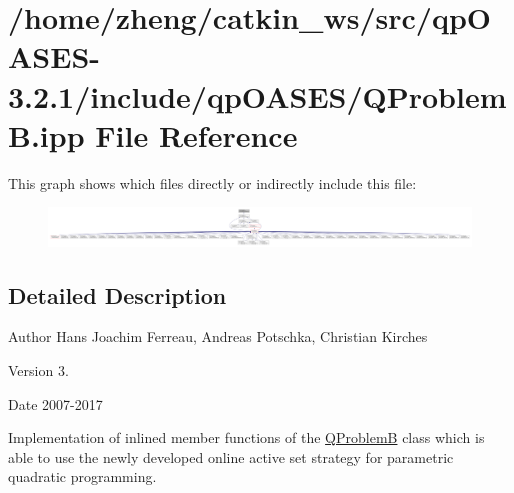\hypertarget{_q_problem_b_8ipp}{}\section{/home/zheng/catkin\+\_\+ws/src/qp\+O\+A\+S\+E\+S-\/3.2.1/include/qp\+O\+A\+S\+E\+S/\+Q\+ProblemB.ipp File Reference}
\label{_q_problem_b_8ipp}
This graph shows which files directly or indirectly include this file\+:
\nopagebreak
\begin{figure}[H]
\begin{center}
\leavevmode
\includegraphics[width=350pt]{_q_problem_b_8ipp__dep__incl}
\end{center}
\end{figure}


\subsection{Detailed Description}
\begin{DoxyAuthor}{Author}
Hans Joachim Ferreau, Andreas Potschka, Christian Kirches 
\end{DoxyAuthor}
\begin{DoxyVersion}{Version}
3. 
\end{DoxyVersion}
\begin{DoxyDate}{Date}
2007-\/2017
\end{DoxyDate}
Implementation of inlined member functions of the \hyperlink{class_q_problem_b}{Q\+ProblemB} class which is able to use the newly developed online active set strategy for parametric quadratic programming. 